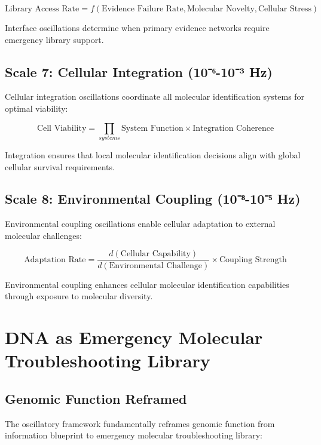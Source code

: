 \documentclass[12pt,a4paper]{article}
\begin{document}
{\begin{equation}
\text{Library Access Rate} = f(\text{Evidence Failure Rate}, \text{Molecular Novelty}, \text{Cellular Stress})
\end{equation}

Interface oscillations determine when primary evidence networks require emergency library support.

\subsection{Scale 7: Cellular Integration (10⁻⁶-10⁻³ Hz)}

Cellular integration oscillations coordinate all molecular identification systems for optimal viability:

\begin{equation}
\text{Cell Viability} = \prod_{systems} \text{System Function} \times \text{Integration Coherence}
\end{equation}

Integration ensures that local molecular identification decisions align with global cellular survival requirements.

\subsection{Scale 8: Environmental Coupling (10⁻⁸-10⁻⁵ Hz)}

Environmental coupling oscillations enable cellular adaptation to external molecular challenges:

\begin{equation}
\text{Adaptation Rate} = \frac{d(\text{Cellular Capability})}{d(\text{Environmental Challenge})} \times \text{Coupling Strength}
\end{equation}

Environmental coupling enhances cellular molecular identification capabilities through exposure to molecular diversity.

\section{DNA as Emergency Molecular Troubleshooting Library}

\subsection{Genomic Function Reframed}

The oscillatory framework fundamentally reframes genomic function from information blueprint to emergency molecular troubleshooting library:

}
\end{document}
